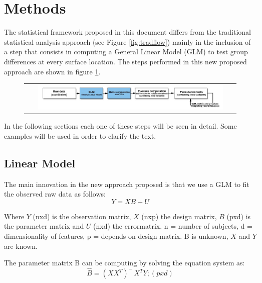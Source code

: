 \documentclass{InsightArticle}
\begin{document}
\section{Methods}
\label{sec:meth}

The statistical framework proposed in this document differs from the traditional statistical analysis approach (see Figure \ref{fig:tradflow}) mainly in the inclusion of a step that consists in computing a General Linear Model (GLM) to test group differences at every surface location. The steps performed in this new proposed approach are shown in figure \ref{fig:newflow}.

\begin{figure}[htbp]
  \begin{center}
    \begin{tabular}[htbp]{c}
    \includegraphics[width=0.9\textwidth]{IJ_NewAp}
    \end{tabular}
    \label{fig:newflow}
  \end{center}
\end{figure}

In the following sections each one of these steps will be seen in detail. Some examples will be used in order to clarify the text.

\subsection{Linear Model}
\label{sec:linearmodel}

The main innovation in the new approach proposed is that we use a GLM to fit the observed raw data as follows:
\begin{equation}
Y = XB + U
\label{eq:GLM}
\end{equation}

Where $Y$ (nxd) is the observation matrix, $X$ (nxp) the design matrix, $B$ (pxd) is the parameter matrix and $U$ (nxd) the errormatrix. n = number of subjects, d = dimensionality of features, p = depends on design matrix. B is unknown, $X$ and $Y$ are known.

The parameter matrix B can be computing by solving the equation system as:
\begin{equation}
\hat{B} = (XX^T )^- \, X^TY ; (pxd)
\end{equation}
\end{document}
